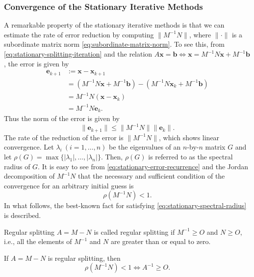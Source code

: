 \subsubsection{{Convergence of the Stationary Iterative Methods}}\label{subsec:stationary-convergence}
{A remarkable property of the stationary iterative methods is that we can estimate the rate of error reduction by computing $\|M^{-1}N\|$, where $\|\cdot\|$ is a subordinate matrix norm \eqref{eq:subordinate-matrix-norm}. To see this, from \eqref{eq:stationary-splitting-iteration} and the relation $A\bm x=\bm b\iff\bm x=M^{-1}N\bm x+M^{-1}\bm b$, the error is given by}
\begin{equation}\label{eq:stationary-error-recurrence}
\begin{aligned}
\bm e_{k+1}&:=\bm x-\bm x_{k+1}\\
&=(M^{-1}N\bm x+M^{-1}\bm b)-(M^{-1}N\bm x_k+M^{-1}\bm b)\\
&=M^{-1}N(\bm x-\bm x_k)\\
&=M^{-1}N\bm e_k.
\end{aligned}
\end{equation}
{Thus the norm of the error is given by}
\[\|\bm e_{k+1}\|\le\|M^{-1}N\|\|\bm e_k\|.\]
{The rate of the reduction of the error is $\|M^{-1}N\|$, which shows linear convergence.}
{Let $\lambda_i\ (i=1,\ldots,n)$ be the eigenvalues of an $n$-by-$n$ matrix $G$ and let $\rho(G)=\max\{|\lambda_1|,\ldots,|\lambda_n|\}$. Then, $\rho(G)$ is referred to as the spectral radius of $G$. It is easy to see from \eqref{eq:stationary-error-recurrence} and the Jordan decomposition of $M^{-1}N$ that the necessary and sufficient condition of the convergence for an arbitrary initial guess is}
\begin{equation}\label{eq:stationary-spectral-radius}\rho(M^{-1}N)<1.\end{equation}
{In what follows, the best-known fact for satisfying \eqref{eq:stationary-spectral-radius} is described.}
\begin{Definition}{{Regular splitting}}\label{def:regular-splitting}
{$A=M-N$ is called regular splitting if $M^{-1}\ge O$ and $N\ge O$, i.e., all the elements of $M^{-1}$ and $N$ are greater than or equal to zero.}
\end{Definition}
\begin{Theorem}\label{thm:regular-splitting-convergence}
{If $A=M-N$ is regular splitting, then}
\[\rho(M^{-1}N)<1\iff A^{-1}\ge O.\]
\end{Theorem}
